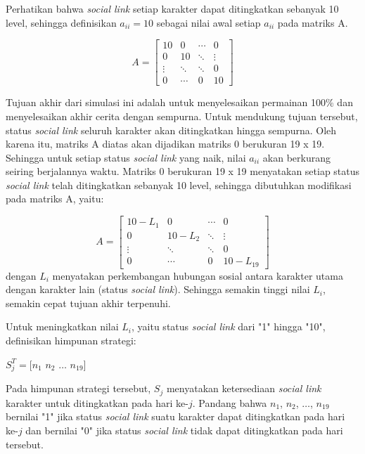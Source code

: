 Perhatikan bahwa \textit{social link} setiap karakter dapat ditingkatkan sebanyak 10 level, sehingga definisikan $a_{ii}= 10$ sebagai nilai awal setiap $a_{ii}$ pada matriks A.

\[
    A =
    \begin{bmatrix}
        10     & 0      & \cdots & 0      \\
        0      & 10     & \ddots & \vdots \\
        \vdots & \ddots & \ddots & 0      \\
        0      & \cdots & 0      & 10
    \end{bmatrix}
\]

Tujuan akhir dari simulasi ini adalah untuk menyelesaikan permainan 100\% dan menyelesaikan akhir cerita dengan sempurna. Untuk mendukung tujuan tersebut, status \textit{social link} seluruh karakter akan ditingkatkan hingga sempurna.
Oleh karena itu, matriks A diatas akan dijadikan matriks 0 berukuran 19 x 19. Sehingga untuk setiap status \textit{social link} yang naik, nilai $a_{ii}$ akan berkurang seiring berjalannya waktu. Matriks 0 berukuran 19 x 19 menyatakan setiap status \textit{social link} telah ditingkatkan sebanyak 10 level, sehingga dibutuhkan modifikasi pada matriks A, yaitu:

\[
    A =
    \begin{bmatrix}
        10-L_{1} & 0        & \cdots & 0         \\
        0        & 10-L_{2} & \ddots & \vdots    \\
        \vdots   & \ddots   & \ddots & 0         \\
        0        & \cdots   & 0      & 10-L_{19}
    \end{bmatrix}
\]
dengan $L_{i}$ menyatakan perkembangan hubungan sosial antara karakter utama dengan karakter lain (status \textit{social link}). Sehingga semakin tinggi nilai $L_{i}$, semakin cepat tujuan akhir terpenuhi.

Untuk meningkatkan nilai $L_{i}$, yaitu status \textit{social link} dari "1" hingga "10", definisikan himpunan strategi:
\begin{center}
    $S_{j}^{T} = [n_1$ $n_2$ $\dots$ $n_{19}]$
\end{center}

Pada himpunan strategi tersebut, $S_{j}$ menyatakan ketersediaan \textit{social link} karakter untuk ditingkatkan pada hari ke-$j$. Pandang bahwa $n_1$, $n_2$, $\dots$, $n_{19}$ bernilai "1" jika status \textit{social link} suatu karakter dapat ditingkatkan pada hari ke-$j$ dan bernilai "0" jika status \textit{social link} tidak dapat ditingkatkan pada hari tersebut.

